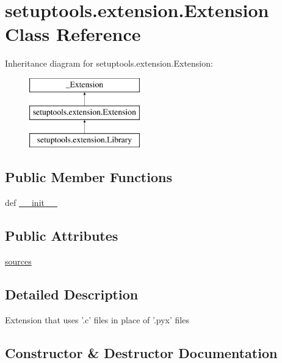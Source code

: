 \hypertarget{classsetuptools_1_1extension_1_1Extension}{}\section{setuptools.\+extension.\+Extension Class Reference}
\label{classsetuptools_1_1extension_1_1Extension}
Inheritance diagram for setuptools.\+extension.\+Extension\+:\begin{figure}[H]
\begin{center}
\leavevmode
\includegraphics[height=3.000000cm]{classsetuptools_1_1extension_1_1Extension}
\end{center}
\end{figure}
\subsection*{Public Member Functions}
\begin{DoxyCompactItemize}
\item 
def \hyperlink{classsetuptools_1_1extension_1_1Extension_a0a39152306933a651b4a1762651fbb19}{\+\_\+\+\_\+init\+\_\+\+\_\+}
\end{DoxyCompactItemize}
\subsection*{Public Attributes}
\begin{DoxyCompactItemize}
\item 
\hyperlink{classsetuptools_1_1extension_1_1Extension_a267f08175ebbf89924e8f8d6d707c5f8}{sources}
\end{DoxyCompactItemize}


\subsection{Detailed Description}
\begin{DoxyVerb}Extension that uses '.c' files in place of '.pyx' files\end{DoxyVerb}
 

\subsection{Constructor \& Destructor Documentation}
\hypertarget{classsetuptools_1_1extension_1_1Extension_a0a39152306933a651b4a1762651fbb19}{}
